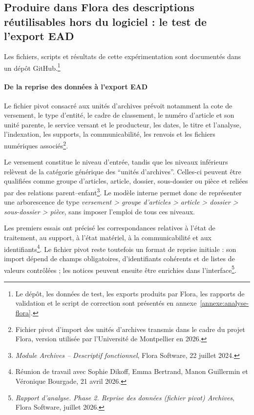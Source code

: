 \subsection{Produire dans Flora des descriptions réutilisables hors du logiciel : le test de l'export EAD}

Les fichiers, scripts et résultats de cette expérimentation sont documentés dans un dépôt GitHub.\footnote{Le dépôt, les données de test, les exports produits par Flora, les rapports de validation et le script de correction sont présentés en annexe~\ref{annexe:analyse-flora}.}

\paragraph{De la reprise des données à l'export EAD}

Le fichier pivot consacré aux unités d'archives prévoit notamment la cote de versement, le type d'entité, le cadre de classement, le numéro d'article et son unité parente, le service versant et le producteur, les dates, le titre et l'analyse, l'indexation, les supports, la communicabilité, les renvois et les fichiers numériques associés\footnote{Fichier pivot d'import des unités d'archives transmis dans le cadre du projet Flora, version utilisée par l'Université de Montpellier en 2026.}.

Le versement constitue le niveau d'entrée, tandis que les niveaux inférieurs relèvent de la catégorie générique des \enquote{unités d'archives}. Celles-ci peuvent être qualifiées comme groupe d'articles, article, dossier, sous-dossier ou pièce et reliées par des relations parent--enfant\footnote{\emph{Module Archives -- Descriptif fonctionnel}, Flora Software, 22 juillet 2024.}. Le modèle interne permet donc de représenter une arborescence de type \emph{versement > groupe d'articles > article > dossier > sous-dossier > pièce}, sans imposer l'emploi de tous ces niveaux.

Les premiers essais ont précisé les correspondances relatives à l'état de traitement, au support, à l'état matériel, à la communicabilité et aux identifiants\footnote{Réunion de travail avec Sophie Dikoff, Emma Bertrand, Manon Guillermin et Véronique Bourgade, 21 avril 2026.}. Le fichier pivot reste toutefois un format de reprise initiale : son import dépend de champs obligatoires, d'identifiants cohérents et de listes de valeurs contrôlées ; les notices peuvent ensuite être enrichies dans l'interface\footnote{\emph{Rapport d'analyse. Phase 2. Reprise des données (fichier pivot) Archives}, Flora Software, juillet 2026.}.

